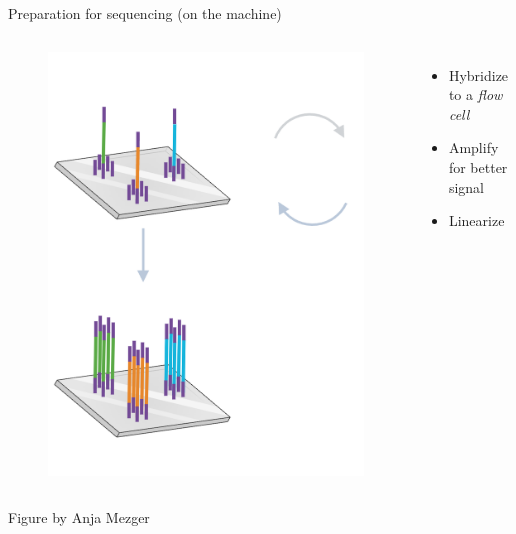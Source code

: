 \documentclass[10pt]{beamer}
\newcommand{\creditdarkleft}[1]{{\vspace{\fill} \par \raggedright \scriptsize \mdseries \color{scMGray} #1 \par}}
\begin{document}
\begin{frame}[standout]{Preparation for sequencing (on the machine)}
	\begin{columns}[T,onlytextwidth]
		\hspace*{-0.7cm} 
		\begin{figure}
			\includegraphics[width=\textwidth]{figures/bridge-amp.png}
		\end{figure}
		\normalsize \normalfont
		\begin{itemize}
			\item Hybridize to a \emph{flow cell} 
			\item Amplify for better signal
			\item Linearize
		\end{itemize}
	\end{columns}
\creditdarkleft{Figure by Anja Mezger}
\end{frame}
\end{document}
